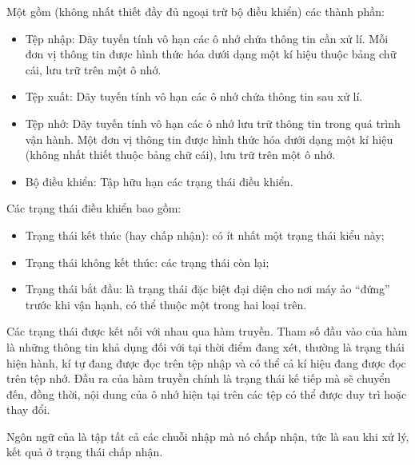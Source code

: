 \begin{defn}[\tr{Automaton}]
  Một  gồm (không nhất thiết đầy đủ ngoại trừ bộ điều khiển) các
  thành phần:\begin{itemize}
    \item Tệp nhập: Dãy tuyến tính vô hạn các ô nhớ chứa thông tin cần xử lí.
      Mỗi đơn vị thông tin được hình thức hóa dưới dạng một kí hiệu thuộc bảng
      chữ cái, lưu trữ trên một ô nhớ.
    \item Tệp xuất: Dãy tuyến tính vô hạn các ô nhớ chứa thông tin sau xử lí.
    \item Tệp nhớ: Dãy tuyến tính vô hạn các ô nhớ lưu trữ thông tin trong quá
      trình vận hành. Một đơn vị thông tin được hình thức hóa dưới dạng một kí
      hiệu (không nhất thiết thuộc bảng chữ cái), lưu trữ trên một ô nhớ.
    \item Bộ điều khiển: Tập hữu hạn các trạng thái điều khiển.
  \end{itemize} Các trạng thái điều khiển bao gồm: \begin{itemize}
    \item Trạng thái kết thúc (hay chấp nhận): có ít nhất một trạng thái kiểu
      này;
    \item Trạng thái không kết thúc: các trạng thái còn lại;
    \item Trạng thái bắt đầu: là trạng thái đặc biệt đại diện cho nơi máy ảo
      ``đứng'' trước khi vận hạnh, có thể thuộc một trong hai loại trên.
  \end{itemize} Các trạng thái được kết nối với nhau qua hàm truyền. Tham số
  đầu vào của hàm là những thông tin khả dụng đối với  tại thời
  điểm đang xét, thường là trạng thái hiện hành, kí tự đang được đọc trên tệp
  nhập và có thể cả kí hiệu đang được đọc trên tệp nhớ. Đầu ra của hàm truyền
  chính là trạng thái kế tiếp mà  sẽ chuyển đến, đồng thời, nội
  dung của ô nhớ hiện tại trên các tệp có thể được duy trì hoặc thay đổi.
\end{defn}

\begin{defn}
  Ngôn ngữ của  là tập tất cả các chuỗi nhập mà nó chấp nhận, tức
  là sau khi xử lý, kết quả ở trạng thái chấp nhận.
\end{defn}
